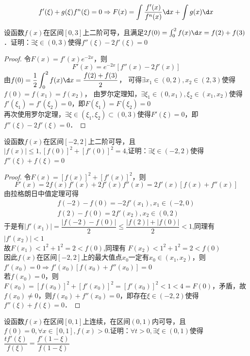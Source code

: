 \documentclass[12pt, a4paper, oneside, UTF8]{ctexbook}
\begin{document}
\begin{myRemark}
    \[
        f'(\xi) + g(\xi)f^n (\xi) =0 \Rightarrow F(x)=\int \dfrac{f'(x)}{f^n (x)} \d x + \int g(x) \d x
    \]
\end{myRemark}
\begin{exercise}
    设函数$f(x)$在区间$[0,3]$上二阶可导，且满足$2f(0)=\int_{0}^{2}f(x)\d x=f(2)+f(3)$．证明：$\exists \xi \in (0,3)$使得$f''(\xi)-2f'(\xi)=0$
\end{exercise}
\begin{proof}
    令$F(x)=f'(x)e^{-2x}$，则
    \[
        F'(x)=e^{-2x}\left[f''(x)-2f'(x)\right]
    \]
    由$f(0)=\dfrac{1}{2}\displaystyle\int_{0}^{2}f(x)\d x=\dfrac{f(2)+f(3)}{2}$，
    可得$\exists x_1 \in (0,2),x_2 \in (2,3)$使得$f(0)=f(x_1)=f(x_2)$，
    由罗尔定理知，$\exists \xi_1 \in (0,x_1),\xi_2 \in (x_1,x_2)$使得$f'(\xi_1)=f'(\xi_2)=0$，即$F(\xi_1)=F(\xi_2)=0$\\
    再次使用罗尔定理，$\exists \xi \in (\xi_1,\xi_2) \subset (0,3)$使得$F'(\xi)=0$，即$f''(\xi)-2f'(\xi)=0$．
\end{proof}
\begin{exercise}
    设函数$f(x)$在区间$[-2,2]$上二阶可导，且$|f(x)| \le 1,[f(0)]^2 +[f'(0)]^2=4$,证明：$\exists \xi \in (-2,2)$使得$f''(\xi)+f(\xi)=0$
\end{exercise}
\begin{proof}
    令$F(x)=[f(x)]^2 +[f'(x)]^2$，则
    \[
        F'(x)=2f(x)f'(x)+2f'(x)f''(x)=2f'(x)[f(x)+f''(x)]
    \]
    由拉格朗日中值定理可得
    \begin{gather*}
        f(-2)-f(0)=-2f'(x_1),x_1 \in (-2,0)\\
        f(2)-f(0)=2f'(x_2),x_2 \in (0,2)
    \end{gather*}
    于是有$|f'(x_1)|=\dfrac{|f(-2)-f(0)|}{2} \le \dfrac{|f(2)|+|f(0)|}{2} < 1$,\quad 同理有$|f'(x_2)|<1$\\
    故$F(x_1) < 1^2 + 1^2 = 2<f(0)$,\quad 同理有 $F(x_2) < 1^2 + 1^2 = 2<f(0)$\\
    因此$f(x)$在区间$[-2,2]$上的最大值点$x_0$一定有$x_0 \in (x_1,x_2) $，则$f'(x_0)=0\Rightarrow f'(x_0)[f(x_0)+f''(x_0)]=0$\\
    若$f(x_0)=0$，则$F(x_0)=[f(x_0)]^2 +[f'(x_0)]^2 = [f'(x_0)]^2 <1<4=F(0)$，矛盾，故$f(x_0) \neq 0$，则$f(x_0)+f''(x_0)=0$，即存在$\xi \in (-2,2)$使得$f''(\xi)+f(\xi)=0$．
\end{proof}
\begin{exercise}
    设函数$f(x)$在区间$[0,1]$上连续，在区间$(0,1)$内可导，且$f(0)=0, \forall x \in [0,1],f(x) >0.$证明：$\forall t >0,\exists \xi \in (0,1)$使得$\dfrac{tf'(\xi)}{f(\xi)}=\dfrac{f'(1-\xi)}{f(1-\xi)}$
\end{exercise}
\end{document}

